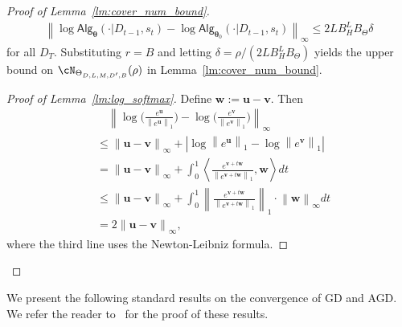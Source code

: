 \documentclass[10pt]{article}
\newcommand{\norm}[1]{\left\|{#1}\right\|}
\newcommand{\lone}[1]{\norm{#1}_1}
\newcommand{\linf}[1]{\norm{#1}_\infty}
\newcommand{\<}{\left\langle}
\renewcommand{\>}{\right\rangle}
\newcommand{\state}{{s}}
\newcommand{\totlen}{{T}}
\newcommand{\sAlg}{{\mathsf{Alg}}}
\newcommand{\dset}{{D}}
\newcommand{\tfpar}{{\btheta}}
\newcommand{\tfparspace}{{\Theta}}
\newcommand{\layer}{{L}}
\newcommand{\hidden}{{D'}}
\newcommand{\head}{{M}}
\newcommand{\normb}{{B}}
\def\btheta{{\boldsymbol \theta}}
\def\bu{{\mathbf u}}
\def\bv{{\mathbf v}}
\def\bw{{\mathbf w}}
\begin{document}
\begin{proof}[Proof of Lemma~\ref{lm:cover_num_bound}]
\begin{align*}
    \linf{\log \sAlg_{\tfpar}(\cdot|\dset_{t-1},\state_t)-\log \sAlg_{\tfpar_0}(\cdot|\dset_{t-1},\state_t)}
     \leq 2\layer\normb_{H}^\layer\normb_\Theta \delta
\end{align*} for all $\dset_\totlen$. Substituting $r=\normb$ and letting $ \delta=\rho/( 2\layer\normb_{H}^\layer\normb_\Theta)$ yields the upper bound on $\cN_{\tfparspace_{D, \layer,\head,\hidden,\normb}}(\rho)$ in Lemma~\ref{lm:cover_num_bound}.
\begin{proof}[Proof of Lemma~\ref{lm:log_softmax}]
Define $\bw:=\bu-\bv$. Then
  \begin{align*}
    &\quad\linf{\log \Big(\frac{e^\bu}{\lone{e^\bu}}\Big)-\log \Big(\frac{e^\bv}{\lone{e^\bv}}\Big)}\\
    &\leq
    \linf{\bu-\bv}+|{\log \lone{e^\bu}-\log \lone{e^\bv}}|\\
    &=
    \linf{\bu-\bv}+\int_{0}^1 \<\frac{e^{\bv+t\bw}}{\lone{e^{\bv+t\bw}}},\bw\> dt\\
     &\leq
    \linf{\bu-\bv}+\int_{0}^1 \lone{\frac{e^{\bv+t\bw}}{\lone{e^{\bv+t\bw}}}}\cdot\linf{\bw} dt\\
    &=2\linf{\bu-\bv},
    \end{align*} where the third line uses the Newton-Leibniz formula.
\end{proof}
\end{proof}
We present the following standard results on the convergence of GD and AGD. We refer the reader to~\cite{nesterov2003introductory} for the proof of these results.
\end{document}
